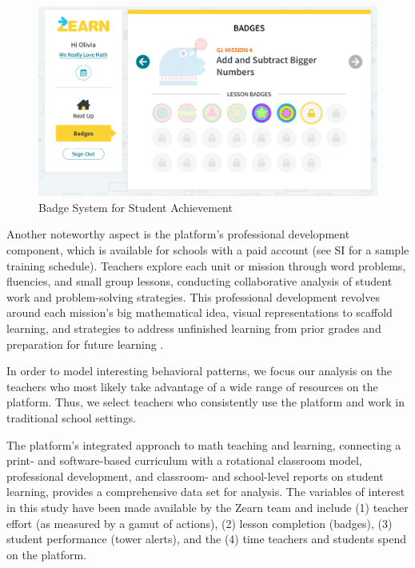 \documentclass[
  number,
  preprint,
  3p,
  onecolumn]{elsarticle}
\begin{document}
\begin{figure}

{\centering \includegraphics{images/badges.PNG}

}

\caption{\label{fig-badges-screen}Badge System for Student Achievement}

\end{figure}

Another noteworthy aspect is the platform's professional development
component, which is available for schools with a paid account (see SI
for a sample training schedule). Teachers explore each unit or mission
through word problems, fluencies, and small group lessons, conducting
collaborative analysis of student work and problem-solving strategies.
This professional development revolves around each mission's big
mathematical idea, visual representations to scaffold learning, and
strategies to address unfinished learning from prior grades and
preparation for future learning \citep{morrison2019}.

In order to model interesting behavioral patterns, we focus our analysis
on the teachers who most likely take advantage of a wide range of
resources on the platform. Thus, we select teachers who consistently use
the platform and work in traditional school settings.

The platform's integrated approach to math teaching and learning,
connecting a print- and software-based curriculum with a rotational
classroom model, professional development, and classroom- and
school-level reports on student learning, provides a comprehensive data
set for analysis. The variables of interest in this study have been made
available by the Zearn team and include (1) teacher effort (as measured
by a gamut of actions), (2) lesson completion (badges), (3) student
performance (tower alerts), and the (4) time teachers and students spend
on the platform.
\end{document}
